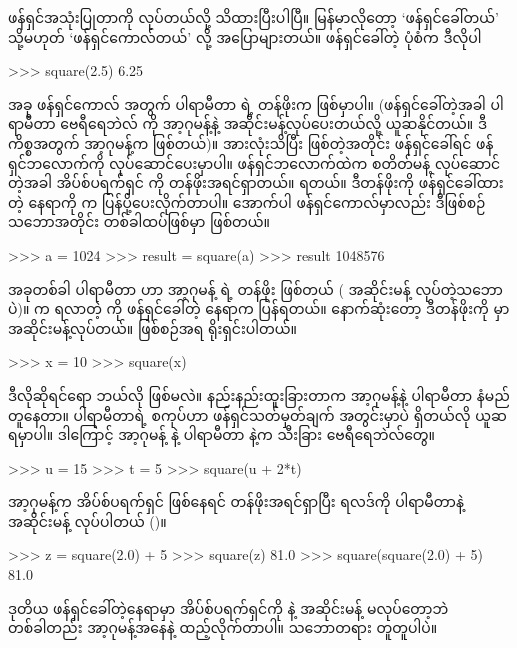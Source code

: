 ဖန်ရှင်အသုံးပြုတာကို  လုပ်တယ်လို့ သိထားပြီးပါပြီ။ မြန်မာလိုတော့ ‘ဖန်ရှင်ခေါ်တယ်’ သို့မဟုတ် ‘ဖန်ရှင်ကောလ်တယ်’ လို့ အပြောများတယ်။ ဖန်ရှင်ခေါ်တဲ့ ပုံစံက ဒီလိုပါ
%
\begin{codetxt}
>>> square(2.5)
6.25
\end{codetxt}
%
အခု ဖန်ရှင်ကောလ် အတွက် ပါရာမီတာ  ရဲ့ တန်ဖိုးက  ဖြစ်မှာပါ။ (ဖန်ရှင်ခေါ်တဲ့အခါ ပါရာမီတာ ဗေရီရေဘဲလ်  ကို အာ့ဂုမန့်နဲ့ အဆိုင်းမန့်လုပ်ပေးတယ်လို့ ယူဆနိုင်တယ်။ ဒီကိစ္စအတွက် အာ့ဂုမန့်က   ဖြစ်တယ်)။ အားလုံးသိပြီး ဖြစ်တဲ့အတိုင်း ဖန်ရှင်ခေါ်ရင် ဖန်ရှင်ဘလောက်ကို လုပ်ဆောင်ပေးမှာပါ။ ဖန်ရှင်ဘလောက်ထဲက  စတိတ်မန့် လုပ်ဆောင်တဲ့အခါ အိပ်စ်ပရက်ရှင်  ကို တန်ဖိုးအရင်ရှာတယ်။  ရတယ်။ ဒီတန်ဖိုးကို ဖန်ရှင်ခေါ်ထားတဲ့ နေရာကို  က ပြန်ပို့ပေးလိုက်တာပါ။ အောက်ပါ ဖန်ရှင်ကောလ်မှာလည်း ဒီဖြစ်စဉ် သဘောအတိုင်း တစ်ခါထပ်ဖြစ်မှာ ဖြစ်တယ်။
%
\begin{codetxt}
>>> a = 1024
>>> result = square(a)
>>> result
1048576
\end{codetxt}
%
အခုတစ်ခါ ပါရာမီတာ  ဟာ အာ့ဂုမန့်  ရဲ့ တန်ဖိုး ဖြစ်တယ် ( အဆိုင်းမန့် လုပ်တဲ့သဘောပဲ)။  က ရလာတဲ့  ကို  ဖန်ရှင်ခေါ်တဲ့ နေရာက ပြန်ရတယ်။ နောက်ဆုံးတော့ ဒီတန်ဖိုးကို  မှာ အဆိုင်းမန့်လုပ်တယ်။ ဖြစ်စဉ်အရ ရိုးရှင်းပါတယ်။
\begin{codetxt}
>>> x = 10
>>> square(x)
\end{codetxt}
ဒီလိုဆိုရင်ရော ဘယ်လို ဖြစ်မလဲ။ နည်းနည်းထူးခြားတာက အာ့ဂုမန့်နဲ့ ပါရာမီတာ နံမည်တူနေတာ။ ပါရာမီတာရဲ့ စကုပ်ဟာ ဖန်ရှင်သတ်မှတ်ချက် အတွင်းမှာပဲ ရှိတယ်လို ယူဆရမှာပါ။ ဒါကြောင့် အာ့ဂုမန့်  နဲ့ ပါရာမီတာ  နဲ့က သီးခြား  ဗေရီရေဘဲလ်တွေ။ 
\begin{codetxt}
>>> u = 15
>>> t = 5
>>> square(u + 2*t)
\end{codetxt} 
အာ့ဂုမန့်က အိပ်စ်ပရက်ရှင် ဖြစ်နေရင် တန်ဖိုးအရင်ရှာပြီး ရလဒ်ကို ပါရာမီတာနဲ့ အဆိုင်းမန့် လုပ်ပါတယ် ()။
\begin{codetxt}
>>> z = square(2.0) + 5
>>> square(z)
81.0
>>> square(square(2.0) + 5)
81.0
\end{codetxt}
ဒုတိယ ဖန်ရှင်ခေါ်တဲ့နေရာမှာ အိပ်စ်ပရက်ရှင်ကို  နဲ့ အဆိုင်းမန့် မလုပ်တော့ဘဲ တစ်ခါတည်း အာ့ဂုမန့်အနေနဲ့ ထည့်လိုက်တာပါ။ သဘောတရား တူတူပါပဲ။


